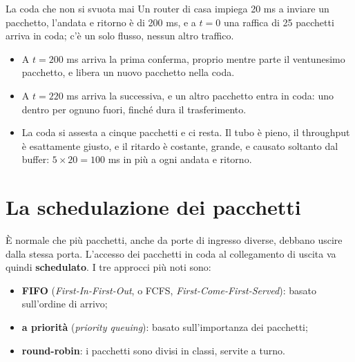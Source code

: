 \begin{esempio}{La coda che non si svuota mai}
Un router di casa impiega 20 ms a inviare un pacchetto, l'andata e ritorno è di 200 ms, e a $t = 0$ una raffica di 25
pacchetti arriva in coda; c'è un solo flusso, nessun altro traffico.
\begin{itemize}
    \item A $t = 200$ ms arriva la prima conferma, proprio mentre parte il ventunesimo pacchetto, e libera un nuovo pacchetto
          nella coda.
    \item A $t = 220$ ms arriva la successiva, e un altro pacchetto entra in coda: uno dentro per ognuno fuori, finché dura il
          trasferimento.
    \item La coda si assesta a cinque pacchetti e ci resta. Il tubo è pieno, il throughput è esattamente giusto, e il ritardo è
          costante, grande, e causato soltanto dal buffer: $5 \times 20 = 100$ ms in più a ogni andata e ritorno.
\end{itemize}
\end{esempio}


\section{La schedulazione dei pacchetti}

È normale che più pacchetti, anche da porte di ingresso diverse, debbano uscire dalla stessa porta. L'accesso dei
pacchetti in coda al collegamento di uscita va quindi \textbf{schedulato}. I tre approcci più noti sono:

\begin{itemize}
    \item \textbf{FIFO} (\emph{First-In-First-Out}, o FCFS, \emph{First-Come-First-Served}): basato sull'ordine di arrivo;
    \item \textbf{a priorità} (\emph{priority queuing}): basato sull'importanza dei pacchetti;
    \item \textbf{round-robin}: i pacchetti sono divisi in classi, servite a turno.
\end{itemize}

